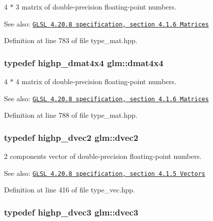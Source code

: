 4 $\ast$ 3 matrix of double-precision floating-point numbers.

\begin{Desc}
\item[See also:]\href{http://www.opengl.org/registry/doc/GLSLangSpec.4.20.8.pdf}{\tt GLSL 4.20.8 specification, section 4.1.6 Matrices} \end{Desc}


Definition at line 783 of file type\_\-mat.hpp.\hypertarget{group__core__types_g54d90d4b902d93638b906571af215bb1}{
\subsubsection[dmat4x4]{\setlength{\rightskip}{0pt plus 5cm}typedef highp\_\-dmat4x4 {\bf glm::dmat4x4}}}
\label{group__core__types_g54d90d4b902d93638b906571af215bb1}


4 $\ast$ 4 matrix of double-precision floating-point numbers.

\begin{Desc}
\item[See also:]\href{http://www.opengl.org/registry/doc/GLSLangSpec.4.20.8.pdf}{\tt GLSL 4.20.8 specification, section 4.1.6 Matrices} \end{Desc}


Definition at line 788 of file type\_\-mat.hpp.\hypertarget{group__core__types_ge6727259898288cae197724d5f172b3b}{
\subsubsection[dvec2]{\setlength{\rightskip}{0pt plus 5cm}typedef highp\_\-dvec2 {\bf glm::dvec2}}}
\label{group__core__types_ge6727259898288cae197724d5f172b3b}


2 components vector of double-precision floating-point numbers.

\begin{Desc}
\item[See also:]\href{http://www.opengl.org/registry/doc/GLSLangSpec.4.20.8.pdf}{\tt GLSL 4.20.8 specification, section 4.1.5 Vectors} \end{Desc}


Definition at line 416 of file type\_\-vec.hpp.\hypertarget{group__core__types_g7f3287f952e6ccb481231368091702ac}{
\subsubsection[dvec3]{\setlength{\rightskip}{0pt plus 5cm}typedef highp\_\-dvec3 {\bf glm::dvec3}}}
\label{group__core__types_g7f3287f952e6ccb481231368091702ac}



